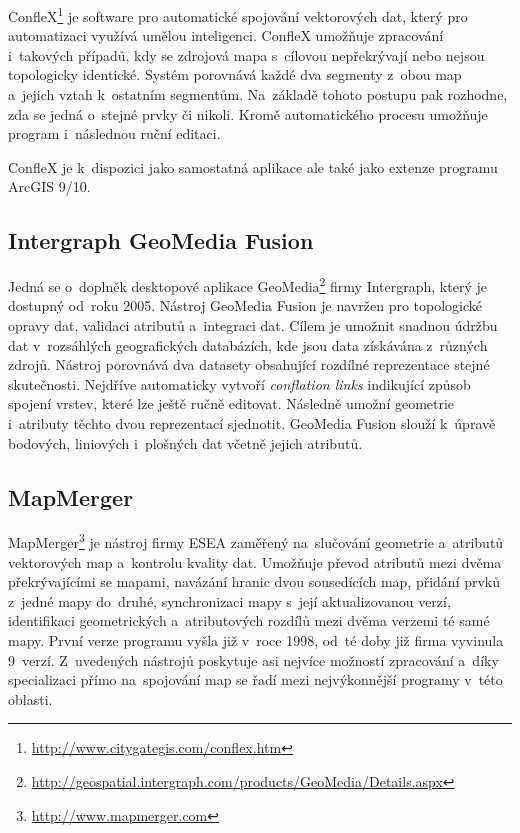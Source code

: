 ConfleX\footnote{\url{http://www.citygategis.com/conflex.htm}} 
je software pro automatické spojování vektorových  dat,
který pro automatizaci využívá umělou inteligenci. ConfleX umožňuje zpracování 
i~takových případů, kdy se zdrojová mapa s~cílovou nepřekrývají nebo nejsou 
topologicky identické. Systém porovnává každé dva segmenty z~obou map a~jejich
vztah k~ostatním segmentům. Na~základě tohoto postupu pak rozhodne, zda se 
jedná o~stejné prvky či nikoli. Kromě automatického procesu umožňuje program 
i~následnou ruční editaci.

ConfleX je k~dispozici jako samostatná aplikace ale také jako extenze 
programu ArcGIS 9/10.


\subsection{Intergraph GeoMedia Fusion}
\label{geomedia}

Jedná se o~doplněk desktopové aplikace 
GeoMedia\footnote{\url{http://geospatial.intergraph.com/products/GeoMedia/Details.aspx}}
firmy Intergraph, který je dostupný od~roku 2005. Nástroj GeoMedia Fusion  
je navržen pro topologické opravy dat, validaci atributů a~integraci dat. Cílem 
je umožnit snadnou údržbu dat v~rozsáhlých geografických databázích, kde jsou 
data získávána z~různých zdrojů. Nástroj porovnává dva datasety obsahující 
rozdílné reprezentace stejné skutečnosti. Nejdříve automaticky vytvoří 
\textit{conflation links} indikující způsob spojení vrstev, které lze ještě
ručně editovat. Následně umožní geometrie i~atributy těchto dvou reprezentací
sjednotit. GeoMedia Fusion slouží k~úpravě bodových, liniových i~plošných dat
včetně jejich atributů. 


\subsection{MapMerger}
\label{mapmerger}

MapMerger\footnote{\url{http://www.mapmerger.com}} je  nástroj firmy 
ESEA zaměřený na~slučování geometrie a~atributů vektorových map a~kontrolu 
kvality dat. Umožňuje převod atributů mezi dvěma překrývajícími se mapami, 
navázání hranic dvou sousedících map, přidání prvků z~jedné mapy do~druhé, 
synchronizaci mapy s~její aktualizovanou verzí, identifikaci geometrických 
a~atributových rozdílů mezi dvěma verzemi té samé mapy. První verze programu 
vyšla již v~roce 1998, od~té doby již firma vyvinula 9~verzí. Z~uvedených 
nástrojů poskytuje asi nejvíce možností zpracování a~díky specializaci 
přímo na~spojování map se řadí mezi nejvýkonnější programy v~této oblasti. 


